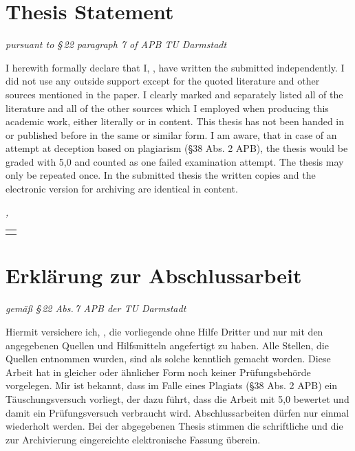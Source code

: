  \chapter*{Thesis Statement}
\thispagestyle{empty}
\begingroup
\let\cleardoublepage\relax
\begin{flushright}
	\emph{pursuant to §\,22 paragraph 7 of APB TU Darmstadt}
\end{flushright}
I herewith formally declare that I, \myName{}, have written the submitted \myDegree{} independently. I did not use any outside support except for the quoted literature and other sources mentioned in the paper. I clearly marked and separately listed all of the literature and all of the other sources which I employed when producing this academic work, either literally or in content. This thesis has not been handed in or published before in the same or similar form.
I am aware, that in case of an attempt at deception based on plagiarism (§38 Abs. 2 APB), the thesis would be graded with 5,0 and counted as one failed examination attempt. The thesis may only be repeated once.
In the submitted thesis the written copies and the electronic version for archiving are identical in content.

\bigskip

\noindent\textit{\myLocation, \myTime}

\begin{flushright}
	\begin{tabular}{m{5cm}}
		\\ \hline
		\centering\myName \\
	\end{tabular}
\end{flushright}

\vfill

 \chapter*{Erklärung zur Abschlussarbeit}
\begin{flushright}
	\emph{gemäß §\,22 Abs.\,7 APB der TU Darmstadt}
\end{flushright}
Hiermit versichere ich, \myName{}, die vorliegende \myDegree{} ohne Hilfe Dritter und nur mit den angegebenen Quellen und Hilfsmitteln angefertigt zu haben. Alle Stellen, die Quellen entnommen wurden, sind als solche kenntlich gemacht worden. Diese Arbeit hat in gleicher oder ähnlicher Form noch keiner Prüfungsbehörde vorgelegen.
Mir ist bekannt, dass im Falle eines Plagiats (§38 Abs. 2 APB) ein Täuschungsversuch vorliegt, der dazu führt, dass die Arbeit mit 5,0 bewertet und damit ein Prüfungsversuch verbraucht wird. Abschlussarbeiten dürfen nur einmal wiederholt werden.
Bei der abgegebenen Thesis stimmen die schriftliche und die zur Archivierung eingereichte elektronische Fassung überein.

